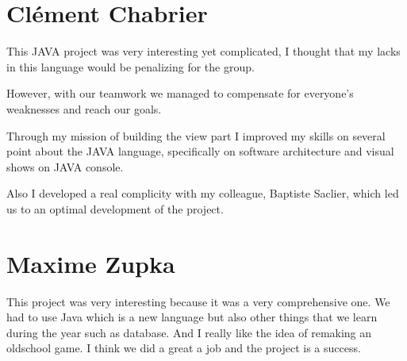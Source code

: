 \documentclass{report}
\begin{document}
\section{Clément Chabrier}

This JAVA project was very interesting yet complicated, I thought that my lacks in this language would be penalizing for the group.

However, with our teamwork we managed to compensate for everyone’s weaknesses and reach our goals.

Through my mission of building the view part I improved my skills on several point about the JAVA language, specifically on software architecture and visual shows on JAVA console.

Also I developed a real complicity with my colleague, Baptiste Saclier, which led us to an optimal development of the project.

\section{Maxime Zupka}

This project was very interesting because it was a very comprehensive one. We had to use Java which is a new language but also other things that we learn during the year such as database. And I really like the idea of remaking an oldschool game. I think we did a great a job and the project is a success. 
\end{document}
